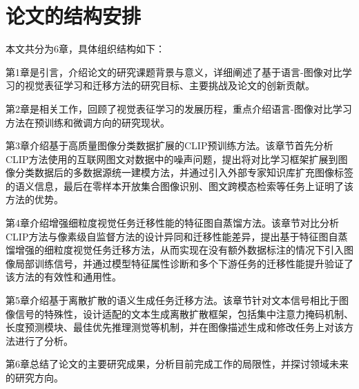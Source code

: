 \section{论文的结构安排}

本文共分为6章，具体组织结构如下：

第1章是引言，介绍论文的研究课题背景与意义，详细阐述了基于语言-图像对比学习的视觉表征学习和迁移方法的研究目标、主要挑战及论文的创新贡献。

第2章是相关工作，回顾了视觉表征学习的发展历程，重点介绍语言-图像对比学习方法在预训练和微调方向的研究现状。

第3章介绍基于高质量图像分类数据扩展的CLIP预训练方法。该章节首先分析CLIP方法使用的互联网图文对数据中的噪声问题，提出将对比学习框架扩展到图像分类数据后的多数据源统一建模方法，并通过引入外部专家知识库扩充图像标签的语义信息，最后在零样本开放集合图像识别、图文跨模态检索等任务上证明了该方法的优势。

第4章介绍增强细粒度视觉任务迁移性能的特征图自蒸馏方法。该章节对比分析CLIP方法与像素级自监督方法的设计异同和迁移性能差异，提出基于特征图自蒸馏增强的细粒度视觉任务迁移方法，从而实现在没有额外数据标注的情况下引入图像局部训练信号，并通过模型特征属性诊断和多个下游任务的迁移性能提升验证了该方法的有效性和通用性。

第5章介绍基于离散扩散的语义生成任务迁移方法。该章节针对文本信号相比于图像信号的特殊性，设计适配的文本生成离散扩散框架，包括集中注意力掩码机制、长度预测模块、最佳优先推理测觉等机制，并在图像描述生成和修改任务上对该方法进行了分析。

第6章总结了论文的主要研究成果，分析目前完成工作的局限性，并探讨领域未来的研究方向。